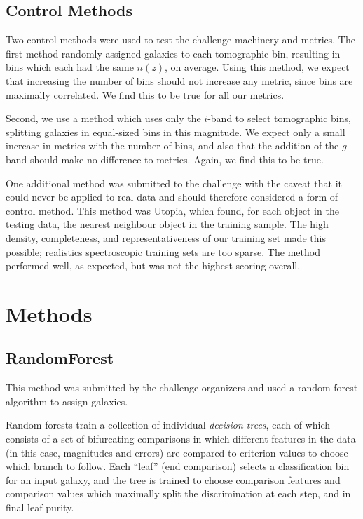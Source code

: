 \documentclass[twocolumn,twocolappendix]{aastex63}
\begin{document}
\subsection{Control Methods}

Two control methods were used to test the challenge machinery and metrics.
The first method randomly assigned galaxies to each tomographic bin, resulting
in bins which each had the same $n(z)$, on average.  Using this method, we expect
that increasing the number of bins should not increase any metric, since bins are
maximally correlated.  We find this to be true for all our metrics.

Second, we use a method which uses only the $i$-band to select tomographic bins,
splitting galaxies in equal-sized bins in this magnitude. We expect only a small
increase in metrics with the number of bins, and also that the addition of the $g$-band
should make no difference to metrics.  Again, we find this to be true.

One additional method was submitted to the challenge with the caveat that it could
never be applied to real data and should therefore considered a form of control method.
This method was {\sc Utopia}, which found, for each object in the testing data, the
nearest neighbour object in the training sample.  The high density, completeness, and
representativeness of our training set made this possible; realistics spectroscopic training
sets are too sparse.  The method performed well, as expected, 
but was not the highest scoring overall.


\section{Methods}

\subsection{ {\sc RandomForest} }
This method was submitted by the challenge organizers and used a random
forest algorithm to assign galaxies.

Random forests \cite{breiman2001} train a collection of individual \emph{decision trees},
each of which consists of a set of bifurcating comparisons in which different features in
the data (in this case, magnitudes and errors) are compared to criterion values to choose
which branch to follow.  Each ``leaf'' (end comparison) selects a classification bin for
an input galaxy, and the tree is trained to choose comparison features and comparison values
which maximally split the discrimination at each step, and in final leaf purity.
\end{document}
